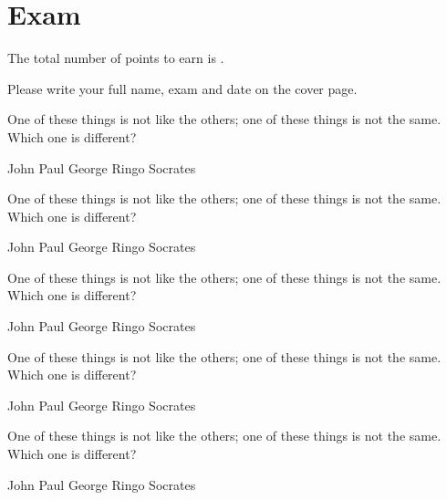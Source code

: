 \documentclass[a4paper,answers,addpoints]{exam}
\begin{document}
\section*{Exam}
The total number of points to earn is \numpoints.

\hrulefill


\begin{questions}

\question[5]
Please write your full name, exam and date on the cover page.

\question[5]
One of these things is not like the others; one of these
things is not the same. Which one is different?

\begin{randomizechoices}
\choice John
\choice Paul
\choice George
\choice Ringo
\CorrectChoice Socrates
\end{randomizechoices}

\question[5]
One of these things is not like the others; one of these
things is not the same. Which one is different?

\begin{choices}
\choice John
\choice Paul
\choice George
\choice Ringo
\CorrectChoice Socrates
\end{choices}


\question[5]
One of these things is not like the others; one of these
things is not the same. Which one is different?

\begin{randomizeoneparchoices}[keeplast]
\choice John
\choice Paul
\choice George
\choice Ringo
\CorrectChoice Socrates
\end{randomizeoneparchoices}

\question[5]
One of these things is not like the others; one of these
things is not the same. Which one is different?

\begin{oneparchoices}
\choice John
\choice Paul
\choice George
\choice Ringo
\CorrectChoice Socrates
\end{oneparchoices}

\question[5]
One of these things is not like the others; one of these
things is not the same. Which one is different?

\begin{randomizechoices}
\choice John
\choice Paul
\choice George
\choice Ringo
\CorrectChoice Socrates
\end{randomizechoices}


\end{questions}
\end{document}
